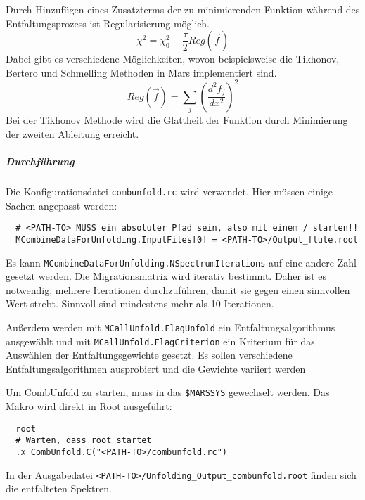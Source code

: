 Durch Hinzufügen eines Zusatzterms der zu minimierenden Funktion während des
Entfaltungsprozess ist Regularisierung möglich.
\begin{equation}
    \chi^2 = \chi^2_0 - \frac{\tau}{2} Reg(\vec{f})
\end{equation}
Dabei gibt es verschiedene Möglichkeiten,
wovon beispielsweise die Tikhonov, Bertero
und Schmelling Methoden in Mars implementiert sind.
\begin{equation}
    Reg(\vec{f}) = \sum_j {\left( \frac{d^2 f_j}{dx^2} \right)}^2
\end{equation}
Bei der Tikhonov Methode wird die Glattheit der
Funktion durch Minimierung der zweiten Ableitung erreicht.

\subparagraph{Durchführung}%

Die Konfigurationsdatei \texttt{combunfold.rc} wird verwendet.
Hier müssen einige Sachen angepasst werden:
\begin{lstlisting}
  # <PATH-TO> MUSS ein absoluter Pfad sein, also mit einem / starten!!
  MCombineDataForUnfolding.InputFiles[0] = <PATH-TO>/Output_flute.root
\end{lstlisting}
Es kann
\texttt{MCombineDataForUnfolding.NSpectrumIterations}
auf eine andere Zahl gesetzt werden.
Die Migrationsmatrix wird iterativ bestimmt.
Daher ist es notwendig, mehrere
Iterationen durchzuführen, damit sie gegen einen sinnvollen Wert strebt.
Sinnvoll sind mindestens mehr als 10 Iterationen.

Außerdem werden mit
\texttt{MCallUnfold.FlagUnfold}
ein Entfaltungsalgorithmus ausgewählt und mit
\texttt{MCallUnfold.FlagCriterion}
ein Kriterium für das Auswählen der Entfaltungsgewichte gesetzt.
Es sollen verschiedene Entfaltungsalgorithmen ausprobiert
und die Gewichte variiert werden

Um CombUnfold zu starten, muss in das
\texttt{\$MARSSYS}
gewechselt werden.
Das Makro wird direkt in Root ausgeführt:
\begin{lstlisting}
  root
  # Warten, dass root startet
  .x CombUnfold.C("<PATH-TO>/combunfold.rc")
\end{lstlisting}

In der Ausgabedatei
\texttt{<PATH-TO>/Unfolding\_Output\_combunfold.root}
finden sich die entfalteten Spektren.
